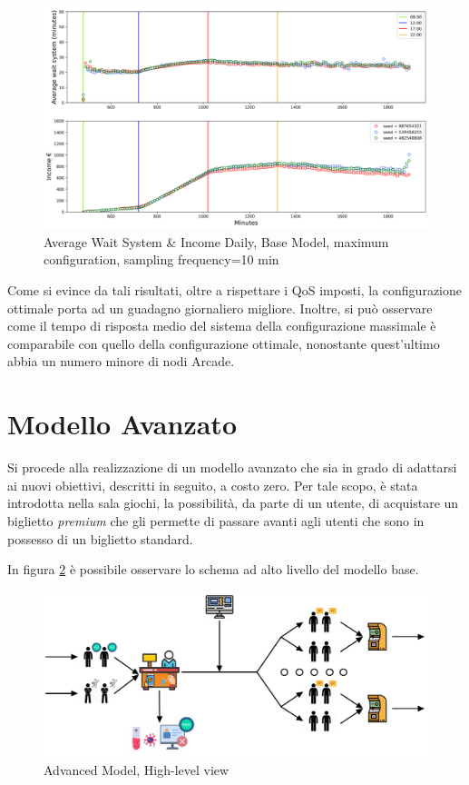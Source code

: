 \documentclass{article}
\begin{document}
\begin{figure}[H]
	\centering
	\captionsetup{justification=centering,margin=2cm}
	\includegraphics[scale=0.48]{images/ts_max.png}
	\caption{Average Wait System \& Income Daily, Base Model, maximum configuration, sampling frequency=10 min}\label{figura:ts_max}
\end{figure}
Come si evince da tali risultati, oltre a rispettare i QoS imposti, la configurazione ottimale porta ad un guadagno giornaliero migliore. Inoltre, si può osservare come il tempo di risposta medio del sistema della configurazione massimale è comparabile con quello della configurazione ottimale, nonostante quest'ultimo abbia un numero minore di nodi Arcade.

\section{Modello Avanzato} %

Si procede alla realizzazione di un modello avanzato che sia in grado di adattarsi ai nuovi obiettivi, descritti in seguito, a costo zero. Per tale scopo, è stata introdotta nella sala giochi, la possibilità, da parte di un utente, di acquistare un biglietto \textit{premium} che gli permette di passare avanti agli utenti che sono in possesso di un biglietto standard.
\par In figura \ref{figura:adv_model_high_level} è possibile osservare lo schema ad alto livello del modello base.
\begin{figure}[H]
	\centering
	\captionsetup{justification=centering,margin=2cm}
	\includegraphics[scale=0.65]{images/adv_model_high_level.jpg}
	\caption{Advanced Model, High-level view}\label{figura:adv_model_high_level}
\end{figure}
\end{document}
